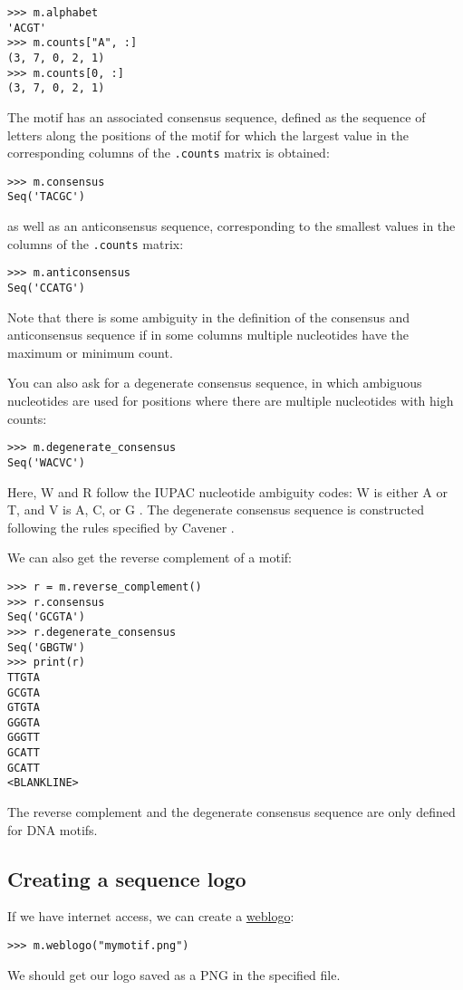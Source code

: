 \begin{verbatim}
>>> m.alphabet
'ACGT'
>>> m.counts["A", :]
(3, 7, 0, 2, 1)
>>> m.counts[0, :]
(3, 7, 0, 2, 1)
\end{verbatim}
The motif has an associated consensus sequence, defined as the sequence of
letters along the positions of the motif for which the largest value in the
corresponding columns of the \verb+.counts+ matrix is obtained:

\begin{verbatim}
>>> m.consensus
Seq('TACGC')
\end{verbatim}
as well as an anticonsensus sequence, corresponding to the smallest values in
the columns of the \verb+.counts+ matrix:

\begin{verbatim}
>>> m.anticonsensus
Seq('CCATG')
\end{verbatim}
Note that there is some ambiguity in the definition of the consensus and anticonsensus sequence if in some columns multiple nucleotides have the maximum or minimum count.

You can also ask for a degenerate consensus sequence, in which ambiguous
nucleotides are used for positions where there are multiple nucleotides with
high counts:

\begin{verbatim}
>>> m.degenerate_consensus
Seq('WACVC')
\end{verbatim}
Here, W and R follow the IUPAC nucleotide ambiguity codes: W is either A or T,
and V is A, C, or G \cite{cornish1985}. The degenerate consensus sequence is
constructed following the rules specified by Cavener \cite{cavener1987}.

We can also get the reverse complement of a motif:

\begin{verbatim}
>>> r = m.reverse_complement()
>>> r.consensus
Seq('GCGTA')
>>> r.degenerate_consensus
Seq('GBGTW')
>>> print(r)
TTGTA
GCGTA
GTGTA
GGGTA
GGGTT
GCATT
GCATT
<BLANKLINE>
\end{verbatim}

The reverse complement and the degenerate consensus sequence are
only defined for DNA motifs.

\subsection{Creating a sequence logo}
If we have internet access, we can create a \href{https://weblogo.berkeley.edu}{weblogo}:
\begin{verbatim}
>>> m.weblogo("mymotif.png")
\end{verbatim}
We should get our logo saved as a PNG in the specified file.

